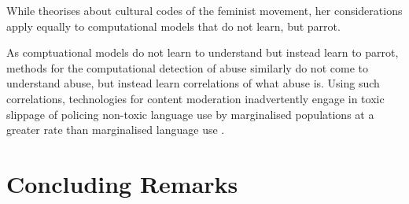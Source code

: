 While \citet{Rissam:2015} theorises about cultural codes of the feminist movement, her considerations apply equally to computational models that do not learn, but parrot\citep{Bender:2020}.

As comptuational models do not learn to understand \citep{Bender:2020} but instead learn to parrot, methods for the computational detection of abuse similarly do not come to understand abuse, but instead learn correlations of what abuse is. Using such correlations, technologies for content moderation inadvertently engage in toxic slippage of policing non-toxic language use by marginalised populations at a greater rate than marginalised language use \cite{Oliva:2020}.

\section{Concluding Remarks}

